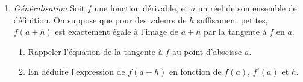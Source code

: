 \documentclass[11pt]{article}
\begin{document}
\begin{exercice}
\begin{enumerate}
    \item \emph{Généralisation} Soit $f$ une fonction dérivable, et $a$ un réel de son ensemble de définition.
      On suppose que pour des valeurs de $h$ suffisament petites, $f\left( a+h \right)$ est exactement égale à l'image de $a+h$ par la tangente à $f$ en $a$.
      \begin{enumerate}
        \item Rappeler l'équation de la tangente à $f$ au point d'abscisse $a$.
        \item En déduire l'expression de $f\left( a+h \right)$ en fonction de $f\left( a \right)$, $f'\left( a \right)$ et $h$.
      \end{enumerate}
  \end{enumerate}
\end{exercice}
\end{document}
